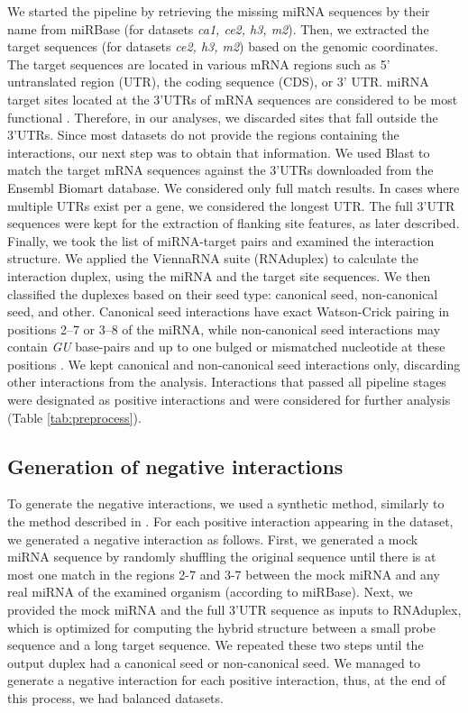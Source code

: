 \documentclass{bmcart}
\begin{document}
We started the pipeline by retrieving the missing miRNA sequences by their name from miRBase (for datasets  \textit{ca1, ce2, h3, m2}). Then, we extracted the target sequences (for datasets \textit{ce2, h3, m2}) based on the genomic coordinates. The target sequences are located in various mRNA regions such as 5’ untranslated region (UTR), the coding sequence (CDS), or 3’ UTR. miRNA target sites located at the 3’UTRs of mRNA sequences are considered to be most functional \cite{menor2014mirmark, baek2008impact}. Therefore, in our analyses, we discarded sites that fall outside the 3’UTRs. Since most datasets do not provide the regions containing the interactions, our next step was to obtain that information. We used Blast \cite{altschul1990basic_blast} to match the target mRNA sequences against the 3'UTRs downloaded from the Ensembl Biomart database. We considered only full match results. In cases where multiple UTRs exist per a gene, we considered the longest UTR. The full 3'UTR sequences were kept for the extraction of flanking site features, as later described. Finally, we took the list of miRNA-target pairs and examined the interaction structure. We applied the ViennaRNA suite (RNAduplex) \cite{lorenz2011viennarna} to calculate the interaction duplex, using the miRNA and the target site sequences. We then classified the duplexes based on their seed type: canonical seed, non-canonical seed, and other. Canonical seed interactions have exact Watson-Crick pairing in positions 2–7 or 3–8 of the miRNA, while non-canonical seed interactions may contain \textit{GU} base-pairs and up to one bulged or mismatched nucleotide at these positions \cite{helwak2013mapping}. We kept canonical and non-canonical seed interactions only, discarding other interactions from the analysis.
Interactions that passed all pipeline stages were designated as positive interactions and were considered for further analysis (Table \ref{tab:preprocess}).



\subsection*{Generation of negative interactions}
To generate the negative interactions, we used a synthetic method, similarly to the method described in \cite{menor2014mirmark, john2004human, maragkakis2009accurate}. For each positive interaction appearing in the dataset, we generated a negative interaction as follows. First, we generated a mock miRNA sequence by randomly shuffling the original sequence until there is at most one match in the regions 2-7 and 3-7 between the mock miRNA and any real miRNA of the examined organism (according to miRBase). Next, we provided the mock miRNA and the full 3'UTR sequence as inputs to RNAduplex, which is optimized for computing the hybrid structure between a small probe sequence and a long target sequence. We repeated these two steps until the output duplex had a canonical seed or non-canonical seed. 
We managed to generate a negative interaction for each positive interaction, thus, at the end of this process, we had balanced datasets.
\end{document}
